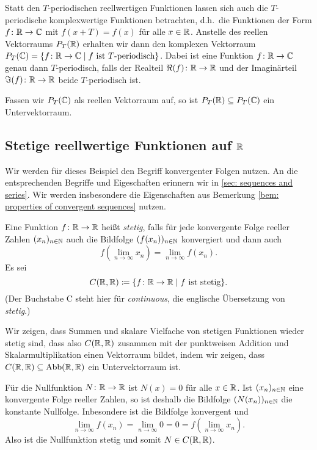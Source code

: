 \begin{bem}
 Statt den $T$-periodischen reellwertigen Funktionen lassen sich auch die $T$-periodische komplexwertige Funktionen betrachten, d.h.\ die Funktionen der Form \mbox{$f \colon \mathbb{R} \to \mathbb{C}$} mit $f(x+T) = f(x)$ für alle $x \in \mathbb{R}$. Anstelle des reellen Vektorraums $P_T(\mathbb{R})$ erhalten wir dann den komplexen Vektorraum $P_T(\mathbb{C}) = \{f \colon \mathbb{R} \to \mathbb{C} \mid \text{$f$ ist $T$-periodisch} \}$. Dabei ist eine Funktion $f \colon \mathbb{R} \to \mathbb{C}$ genau dann $T$-periodisch, falls der Realteil $\Re(f) \colon \mathbb{R} \to \mathbb{R}$ und der Imaginärteil $\Im(f) \colon \mathbb{R} \to \mathbb{R}$ beide $T$-periodisch ist.
 
 Fassen wir $P_T(\mathbb{C})$ als reellen Vektorraum auf, so ist $P_T(\mathbb{R}) \subseteq P_T(\mathbb{C})$ ein Untervektorraum.
\end{bem}



\subsection{Stetige reellwertige Funktionen auf \texorpdfstring{$\mathbb{R}$}{R}}
Wir werden für dieses Beispiel den Begriff konvergenter Folgen nutzen. An die entsprechenden Begriffe und Eigeschaften erinnern wir in \ref{sec: sequences and series}. Wir werden insbesondere die Eigenschaften aus Bemerkung \ref{bem: properties of convergent sequences} nutzen.

\begin{defi}
 Eine Funktion $f \colon \mathbb{R} \to \mathbb{R}$ heißt \emph{stetig}, falls für jede konvergente Folge reeller Zahlen $(x_n)_{n \in \mathbb{N}}$ auch die Bildfolge $(f(x_n))_{n \in \mathbb{N}}$ konvergiert und dann auch
 \[
  f\left( \lim_{n \to \infty} x_n \right)
  = \lim_{n \to \infty} f(x_n).
 \]
 Es sei
 \[
  C(\mathbb{R},\mathbb{R}) \coloneqq \{f \colon \mathbb{R} \to \mathbb{R} \mid \text{$f$ ist stetig}\}.
 \]
 (Der Buchstabe C steht hier für \emph{continuous}, die englische Übersetzung von \emph{stetig}.)
\end{defi}

Wir zeigen, dass Summen und skalare Vielfache von stetigen Funktionen wieder stetig sind, dass also $C(\mathbb{R},\mathbb{R})$ zusammen mit der punktweisen Addition und Skalarmultiplikation einen Vektorraum bildet, indem wir zeigen, dass $C(\mathbb{R}, \mathbb{R}) \subseteq \mathrm{Abb}(\mathbb{R}, \mathbb{R})$ ein Untervektorraum ist.

Für die Nullfunktion $N \colon \mathbb{R} \to \mathbb{R}$ ist $N(x) = 0$ für alle $x \in \mathbb{R}$. Ist $(x_n)_{n \in \mathbb{N}}$ eine konvergente Folge reeller Zahlen, so ist deshalb die Bildfolge $(N(x_n))_{n \in \mathbb{N}}$ die konstante Nullfolge. Inbesondere ist die Bildfolge konvergent und
\[
 \lim_{n \to \infty} f(x_n)
 = \lim_{n \to \infty} 0
 = 0
 = f\left( \lim_{n \to \infty} x_n \right).
\]
Also ist die Nullfunktion stetig und somit $N \in C(\mathbb{R},\mathbb{R})$.

